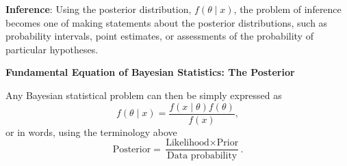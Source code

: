 \documentclass[10pt, a4paper]{article}
\begin{document}
\textbf{Inference}:
Using the posterior distribution,
$f(\theta\mid x)$,
the problem of inference becomes one of making statements about the posterior distributions,
such as probability intervals,
point estimates,
or assessments of the probability of particular hypotheses.


\textbf{Fundamental Equation of Bayesian Statistics:
The Posterior}

Any Bayesian statistical problem can then be simply expressed as
\[
f(\theta\mid x) = \frac{f(x\mid\theta)f(\theta)}{f(x)},
\]
or in words,
using the terminology above
\[
\text{Posterior} = \frac{\text{Likelihood} \times \text{Prior}}{\text{Data probability}}.
\]
\end{document}
